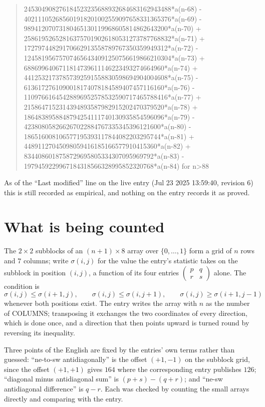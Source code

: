 \documentclass[11pt,a4paper]{article}
\theoremstyle{plain}
\theoremstyle{definition}
\begin{document}
\begin{quote}
245304908276184523235688932684683162943488*a(n-68) - 402111052685601918201002559097658331365376*a(n-69) - 98941207073180465130119968605814862643200*a(n-70) + 258619526528163757019026180531273787768832*a(n-71) + 17279744829170662913558789767350359949312*a(n-72) - 124581956757074656434091250756619866210304*a(n-73) + 6886996406711814739611146223493274664960*a(n-74) + 44125321737857392591558830598694904004608*a(n-75) - 6136172761090018174078184589407457116160*a(n-76) - 11097661645428896952578532590717465788416*a(n-77) + 2158647152314394893587982915202470379520*a(n-78) + 1864838958848794254111740130935854596096*a(n-79) - 423808058266267022884767335345396121600*a(n-80) - 186516008106577195393117844082203295744*a(n-81) + 44891127045098059416185166577910415360*a(n-82) + 8344086018758729695805334307095969792*a(n-83) - 1979459229967184318566328995852320768*a(n-84) for n>88
\end{quote}
As of the ``Last modified'' line on the live entry (Jul 23 2025 13:59:40, revision 6) this is still
recorded as empirical, and nothing on the entry records it as proved.

\section{What is being counted}

The $2\times2$ subblocks of an $(n+1)\times8$ array over $\{0,\dots,1\}$ form a grid
of $n$ rows and $7$ columns; write $\sigma(i,j)$ for the value the entry's statistic takes on
the subblock in position $(i,j)$, a function of its four entries
$\begin{pmatrix}p&q\\r&s\end{pmatrix}$ alone. The condition is
\[
\sigma(i,j)\le\sigma(i+1,j),\qquad \sigma(i,j)\le\sigma(i,j+1),\qquad \sigma(i,j)\ge\sigma(i+1,j-1)
\]
whenever both positions exist. The entry writes the array with $n$ as the number of COLUMNS; transposing it exchanges the two coordinates of every direction, which is done once, and a direction that then points upward is turned round by reversing its inequality.

Three points of the English are fixed by the entries' own terms rather than guessed:
``ne-to-sw antidiagonally'' is the offset $(+1,-1)$ on the subblock grid, since the offset
$(+1,+1)$ gives $164$ where the corresponding entry publishes $126$; ``diagonal minus
antidiagonal sum'' is $(p+s)-(q+r)$; and ``ne-sw antidiagonal difference'' is $q-r$. Each was
checked by counting the small arrays directly and comparing with the entry.
\end{document}
